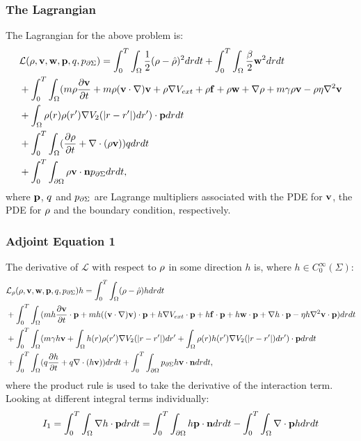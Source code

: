 \subsubsection*{The Lagrangian}
The Lagrangian for the above problem is:
\begin{align*}
&\mathcal{L}(\rho,\mathbf{v},\mathbf{w},\mathbf{p},q,{p}_{\partial \Sigma}) = \int_0^T \int_\Omega  \frac{1}{2}(\rho - \hat {\rho})^2 drdt  +\int_0^T \int_\Omega  \frac{\beta}{2}\mathbf{w}^2 drdt\\
&+ \int_0^T \int_\Omega (m \rho \frac{\partial \mathbf{v}}{\partial t} + m \rho (\mathbf{v} \cdot \nabla)\mathbf{v} + \rho \nabla V_{ext} + \rho \mathbf{f} + \rho \mathbf{w} + \nabla \rho + m\gamma \rho \mathbf{v}  - \rho \eta \nabla^2 \mathbf{v}\\
&+\int_\Omega \rho(r) \rho(r') \nabla V_2(|r-r'|)dr') \cdot \mathbf{p} dr dt\\
& + \int_0^T \int_\Omega (\frac{\partial \rho}{\partial t} + \nabla \cdot (\rho \mathbf{v})) q dr dt\\ 
& +\int_0^T \int_{\partial\Omega} \rho \mathbf{v} \cdot \mathbf{n} {p}_{\partial \Sigma} dr dt,
\end{align*}
where $\mathbf{p}$, $q$ and ${p}_{\partial \Sigma}$ are Lagrange multipliers associated with the PDE for $\mathbf{v}$, the PDE for $\rho$ and the boundary condition, respectively.
\subsubsection*{Adjoint Equation 1}

The derivative of $\mathcal{L}$ with respect to $\rho$ in some direction $h$ is, where ${h} \in C_0^\infty(\Sigma) $:
\begin{align*}
&\mathcal{L}_\rho(\rho,\mathbf{v},\mathbf{w},\mathbf{p},q,{p}_{\partial \Sigma})h = \int_0^T \int_\Omega  (\rho - \hat {\rho})h drdt \\
&+ \int_0^T \int_\Omega (m h \frac{\partial \mathbf{v}}{\partial t}\cdot \mathbf{p} + m h( (\mathbf{v} \cdot \nabla)\mathbf{v} )\cdot \mathbf{p}+ h\nabla V_{ext}\cdot \mathbf{p} + h \mathbf{f} \cdot  \mathbf{p} + h \mathbf{w} \cdot \mathbf{p} + \nabla h\cdot \mathbf{p} - \eta h \nabla^2 \mathbf{v} \cdot \mathbf{p})  dr dt\\
&+ \int_0^T \int_\Omega (m\gamma h \mathbf{v} +\int_\Omega h(r) \rho(r') \nabla V_2(|r-r'|)dr'+\int_\Omega \rho(r) h(r') \nabla V_2(|r-r'|)dr') \cdot \mathbf{p} dr dt\\
& + \int_0^T \int_\Omega (q\frac{\partial h}{\partial t} + q\nabla \cdot (h \mathbf{v}))  dr dt +\int_0^T \int_{\partial\Omega} {p}_{\partial \Sigma} h\mathbf{v} \cdot \mathbf{n}  dr dt,
\end{align*}
where the product rule is used to take the derivative of the interaction term. Looking at different integral terms individually:
\begin{align*}
I_1= \int_0^T \int_\Omega \nabla h\cdot \mathbf{p} dr dt = \int_0^T \int_{\partial \Omega} h \mathbf{p} \cdot \mathbf{n} dr dt - \int_0^T \int_{\Omega} \nabla\cdot \mathbf{p} h dr dt
\end{align*}
 
